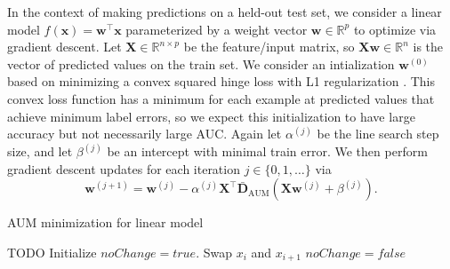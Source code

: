\documentclass{article}
\begin{document}
In the context of making predictions on a held-out test set, we consider a linear model $f(\mathbf x) = \mathbf w^\intercal \mathbf x$ parameterized by a weight vector $\mathbf w\in\mathbb R^p$ to optimize via gradient descent.
Let $\mathbf X\in\mathbb R^{n\times p}$ be the feature/input matrix, so $\mathbf X \mathbf w\in\mathbb R^n$ is the vector of predicted values on the train set.
We consider an intialization $\mathbf{w}^{(0)}$ based on minimizing a convex squared hinge loss with L1 regularization \citep{Hocking2013icml}.
This convex loss function has a minimum for each example at predicted values that achieve minimum label errors, so we expect this initialization to have large accuracy but not necessarily large AUC.
Again let $\alpha^{(j)}$ be the line search step size, and let $\beta^{(j)}$ be an intercept with minimal train error.
We then perform gradient descent updates for each iteration $j\in\{0,1,\dots\}$ via
\begin{equation}
    \mathbf{w}^{(j+1)} = \mathbf{w}^{(j)} - \alpha^{(j)}\mathbf X^\intercal \mathbf {\bar D}_\text{AUM}(\mathbf X \mathbf w^{(j)}  + \beta^{(j)}).
\end{equation}

\begin{algorithm}[tb]
   \caption{AUM minimization for linear model}
   \label{alg:linear-model}
\begin{algorithmic}
    TODO
   \REPEAT
   \STATE Initialize $noChange = true$.
   \STATE Swap $x_i$ and $x_{i+1}$
   \STATE $noChange = false$
   \ENDIF
   \ENDFOR
\end{algorithmic}
\end{algorithm}
\end{document}
